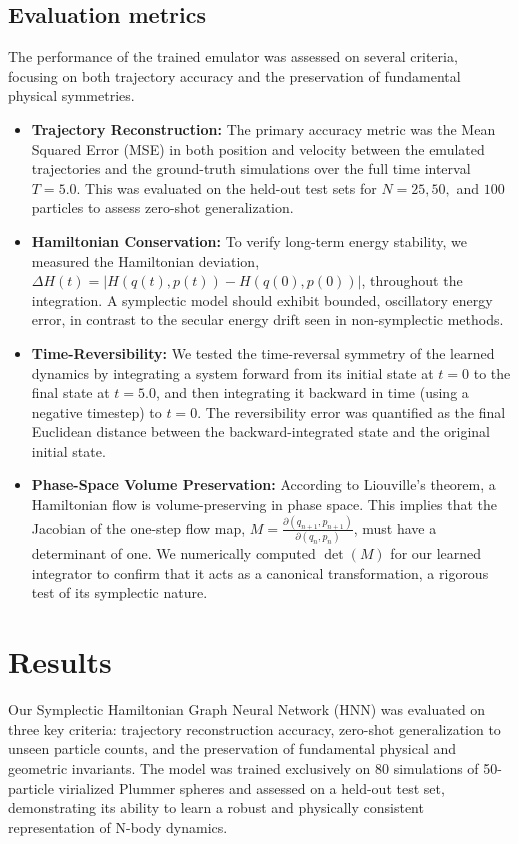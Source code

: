 \documentclass[]{article}
\begin{document}
\subsection{Evaluation metrics}
The performance of the trained emulator was assessed on several criteria, focusing on both trajectory accuracy and the preservation of fundamental physical symmetries.
\begin{itemize}
    \item \textbf{Trajectory Reconstruction:} The primary accuracy metric was the Mean Squared Error (MSE) in both position and velocity between the emulated trajectories and the ground-truth simulations over the full time interval $T=5.0$. This was evaluated on the held-out test sets for $N=25, 50,$ and $100$ particles to assess zero-shot generalization.
    \item \textbf{Hamiltonian Conservation:} To verify long-term energy stability, we measured the Hamiltonian deviation, $\Delta H(t) = |H(q(t), p(t)) - H(q(0), p(0))|$, throughout the integration. A symplectic model should exhibit bounded, oscillatory energy error, in contrast to the secular energy drift seen in non-symplectic methods.
    \item \textbf{Time-Reversibility:} We tested the time-reversal symmetry of the learned dynamics by integrating a system forward from its initial state at $t=0$ to the final state at $t=5.0$, and then integrating it backward in time (using a negative timestep) to $t=0$. The reversibility error was quantified as the final Euclidean distance between the backward-integrated state and the original initial state.
    \item \textbf{Phase-Space Volume Preservation:} According to Liouville's theorem, a Hamiltonian flow is volume-preserving in phase space. This implies that the Jacobian of the one-step flow map, $M = \frac{\partial(q_{n+1}, p_{n+1})}{\partial(q_n, p_n)}$, must have a determinant of one. We numerically computed $\det(M)$ for our learned integrator to confirm that it acts as a canonical transformation, a rigorous test of its symplectic nature.
\end{itemize}

\section{Results}
\label{sec:results}
Our Symplectic Hamiltonian Graph Neural Network (HNN) was evaluated on three key criteria: trajectory reconstruction accuracy, zero-shot generalization to unseen particle counts, and the preservation of fundamental physical and geometric invariants. The model was trained exclusively on 80 simulations of 50-particle virialized Plummer spheres and assessed on a held-out test set, demonstrating its ability to learn a robust and physically consistent representation of N-body dynamics.
\end{document}
